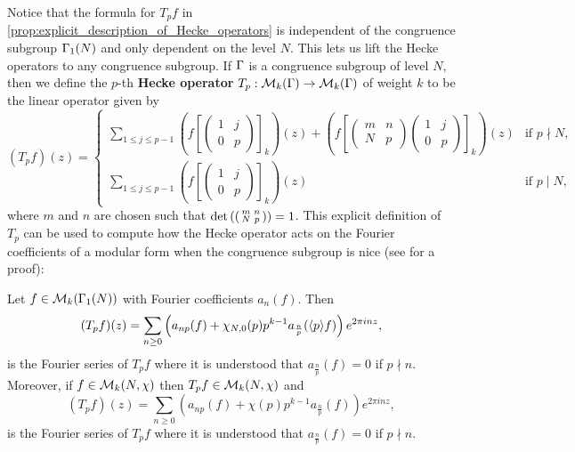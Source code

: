       Notice that the formula for $T_{p}f$ in \cref{prop:explicit_description_of_Hecke_operators} is independent of the congruence subgroup $\Gamma_{1}(N)$ and only dependent on the level $N$. This lets us lift the Hecke operators to any congruence subgroup. If $\Gamma$ is a congruence subgroup of level $N$, then we define the $p$-th \textbf{Hecke operator} $T_{p}:\mathcal{M}_{k}(\Gamma) \to \mathcal{M}_{k}(\Gamma)$ of weight $k$ to be the linear operator given by
      \[
        (T_{p}f)(z) = \begin{cases} \displaystyle\sum_{1 \le j \le p-1}\left(f\left[\begin{pmatrix} 1 & j \\ 0 & p \end{pmatrix}\right]_{k}\right)(z)+\left(f\left[\begin{pmatrix} m & n \\ N & p \end{pmatrix}\begin{pmatrix} 1 & j \\ 0 & p \end{pmatrix}\right]_{k}\right)(z) & \text{if $p \nmid N$}, \\ \displaystyle\sum_{1 \le j \le p-1}\left(f\left[\begin{pmatrix} 1 & j \\ 0 & p \end{pmatrix}\right]_{k}\right)(z) & \text{if $p \mid N$}, \end{cases}
      \]
      where $m$ and $n$ are chosen such that $\det\left(\begin{psmallmatrix} m & n \\ N & p \end{psmallmatrix}\right) = 1$. This explicit definition of $T_{p}$ can be used to compute how the Hecke operator acts on the Fourier coefficients of a modular form when the congruence subgroup is nice (see \cite{diamond2005first} for a proof):

      \begin{proposition}\label{prop:prime_Hecke_operators_acting_on_Fourier_coefficients}
        Let $f \in \mathcal{M}_{k}(\Gamma_{1}(N))$ with Fourier coefficients $a_{n}(f)$. Then
        \[
          (T_{p}f)(z) = \sum_{n \ge 0}\left(a_{np}(f)+\chi_{N,0}(p)p^{k-1}a_{\frac{n}{p}}(\langle p\rangle f)\right)e^{2\pi inz},
        \]
        is the Fourier series of $T_{p}f$ where it is understood that $a_{\frac{n}{p}}(f) = 0$ if $p \nmid n$. Moreover, if $f \in \mathcal{M}_{k}(N,\chi)$ then $T_{p}f \in \mathcal{M}_{k}(N,\chi)$ and
        \[
          (T_{p}f)(z) = \sum_{n \ge 0}\left(a_{np}(f)+\chi(p)p^{k-1}a_{\frac{n}{p}}(f)\right)e^{2\pi inz},
        \]
        is the Fourier series of $T_{p}f$ where it is understood that $a_{\frac{n}{p}}(f) = 0$ if $p \nmid n$.
      \end{proposition}

